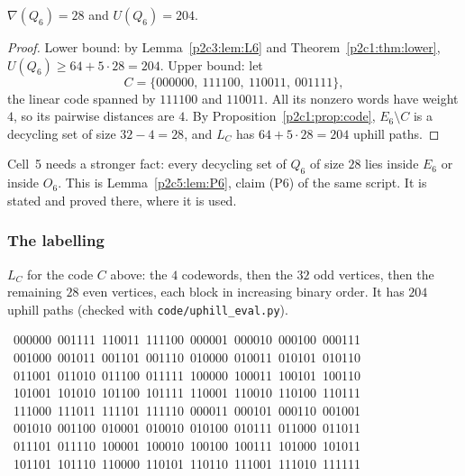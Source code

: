 \begin{theorem}\label{p2c3:thm:main}
$\nabla(Q_6)=28$ and $U(Q_6)=204$.
\end{theorem}

\begin{proof}
Lower bound: by Lemma~\ref{p2c3:lem:L6} and Theorem~\ref{p2c1:thm:lower},
$U(Q_6)\ge64+5\cdot28=204$. Upper bound: let
\[
  C=\{000000,\ 111100,\ 110011,\ 001111\},
\]
the linear code spanned by $111100$ and $110011$. All its nonzero words have weight $4$, so its
pairwise distances are $4$. By Proposition~\ref{p2c1:prop:code}, $E_6\setminus C$ is a decycling
set of size $32-4=28$, and $L_C$ has $64+5\cdot28=204$ uphill paths.
\end{proof}

\begin{remark}\label{p2c3:rem:parity}
Cell~5 needs a stronger fact: every decycling set of $Q_6$ of size $28$ lies inside $E_6$ or
inside $O_6$. This is Lemma~\ref{p2c5:lem:P6}, claim (P6) of the same script. It is stated and
proved there, where it is used.
\end{remark}

\subsubsection{The labelling}\label{p2c3:sec:lab}

$L_C$ for the code $C$ above: the $4$ codewords, then the $32$ odd vertices, then the remaining
$28$ even vertices, each block in increasing binary order. It has $204$ uphill paths (checked with
\texttt{code/uphill\_eval.py}).
\begin{flushleft}\small\ttfamily
{}\ 000000\ 001111\ 110011\ 111100\ 000001\ 000010\ 000100\ 000111\\
\ 001000\ 001011\ 001101\ 001110\ 010000\ 010011\ 010101\ 010110\\
\ 011001\ 011010\ 011100\ 011111\ 100000\ 100011\ 100101\ 100110\\
\ 101001\ 101010\ 101100\ 101111\ 110001\ 110010\ 110100\ 110111\\
\ 111000\ 111011\ 111101\ 111110\ 000011\ 000101\ 000110\ 001001\\
\ 001010\ 001100\ 010001\ 010010\ 010100\ 010111\ 011000\ 011011\\
\ 011101\ 011110\ 100001\ 100010\ 100100\ 100111\ 101000\ 101011\\
\ 101101\ 101110\ 110000\ 110101\ 110110\ 111001\ 111010\ 111111\\
\end{flushleft}
